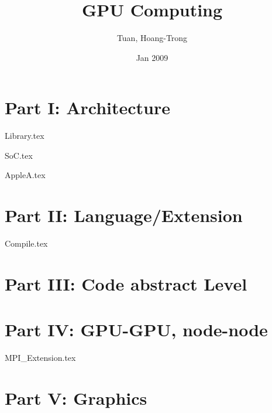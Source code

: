 \documentclass[11pt]{book}
\begin{document}
\author{Tuan, Hoang-Trong}
\title{GPU Computing}
\date{Jan 2009}

\frontmatter
\tableofcontents
%

\mainmatter

\part{Part I: Architecture}


{Library.tex}

{SoC.tex}

{AppleA.tex}

 
\part{Part II: Language/Extension}










{Compile.tex}


\part{Part III: Code abstract Level}






\part{Part IV: GPU-GPU, node-node}


{MPI_Extension.tex}


\part{Part V: Graphics}
 




\end{document}
